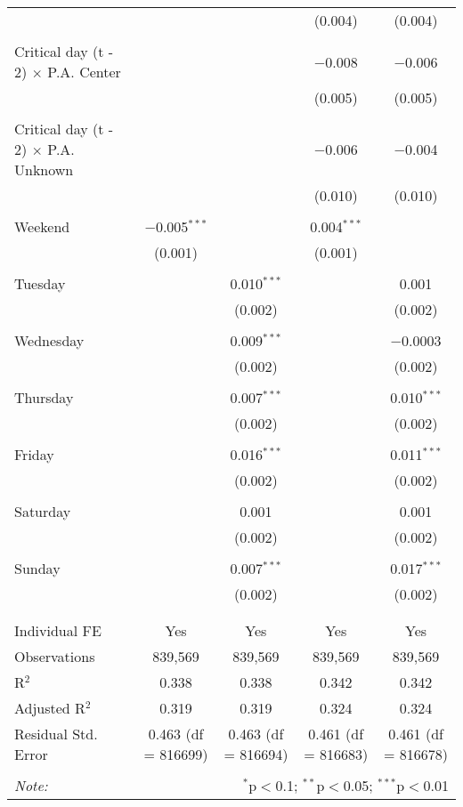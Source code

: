 \documentclass[
]{article}
\begin{document}
\begin{table}[!htbp]
{\begin{tabular}{@{\extracolsep{5pt}}lcccc}
  &  &  & (0.004) & (0.004) \\ 
  & & & & \\ 
 Critical day (t - 2) $\times$ P.A. Center &  &  & $-$0.008 & $-$0.006 \\ 
  &  &  & (0.005) & (0.005) \\ 
  & & & & \\ 
 Critical day (t - 2) $\times$ P.A. Unknown &  &  & $-$0.006 & $-$0.004 \\ 
  &  &  & (0.010) & (0.010) \\ 
  & & & & \\ 
 Weekend & $-$0.005$^{***}$ &  & 0.004$^{***}$ &  \\ 
  & (0.001) &  & (0.001) &  \\ 
  & & & & \\ 
 Tuesday &  & 0.010$^{***}$ &  & 0.001 \\ 
  &  & (0.002) &  & (0.002) \\ 
  & & & & \\ 
 Wednesday &  & 0.009$^{***}$ &  & $-$0.0003 \\ 
  &  & (0.002) &  & (0.002) \\ 
  & & & & \\ 
 Thursday &  & 0.007$^{***}$ &  & 0.010$^{***}$ \\ 
  &  & (0.002) &  & (0.002) \\ 
  & & & & \\ 
 Friday &  & 0.016$^{***}$ &  & 0.011$^{***}$ \\ 
  &  & (0.002) &  & (0.002) \\ 
  & & & & \\ 
 Saturday &  & 0.001 &  & 0.001 \\ 
  &  & (0.002) &  & (0.002) \\ 
  & & & & \\ 
 Sunday &  & 0.007$^{***}$ &  & 0.017$^{***}$ \\ 
  &  & (0.002) &  & (0.002) \\ 
  & & & & \\ 
\hline \\[-1.8ex] 
Individual FE & Yes & Yes & Yes & Yes \\ 
Observations & 839,569 & 839,569 & 839,569 & 839,569 \\ 
R$^{2}$ & 0.338 & 0.338 & 0.342 & 0.342 \\ 
Adjusted R$^{2}$ & 0.319 & 0.319 & 0.324 & 0.324 \\ 
Residual Std. Error & 0.463 (df = 816699) & 0.463 (df = 816694) & 0.461 (df = 816683) & 0.461 (df = 816678) \\ 
\hline 
\hline \\[-1.8ex] 
\textit{Note:}  & \multicolumn{4}{r}{$^{*}$p$<$0.1; $^{**}$p$<$0.05; $^{***}$p$<$0.01} \\ 
\end{tabular}
} 
\end{table} 
\newpage
\end{document}
